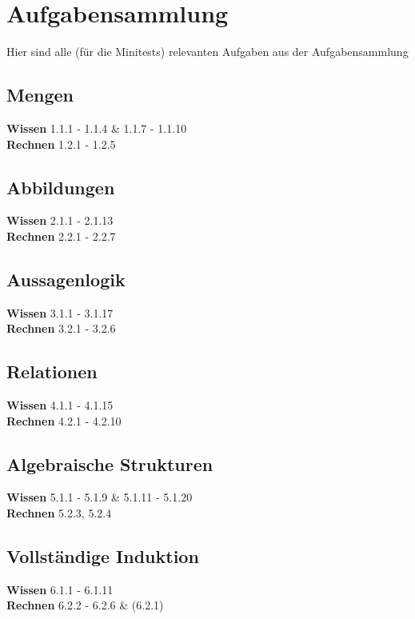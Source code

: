 \documentclass[11pt]{article}
\begin{document}
    \section{Aufgabensammlung}\label{sec:aufgabensammlung}
    Hier sind alle (für die Minitests) relevanten Aufgaben aus der Aufgabensammlung\\
    \subsection{Mengen}\label{subsec:mengen}
    \textbf{Wissen}
    1.1.1 - 1.1.4 \& 1.1.7 - 1.1.10\\
    \textbf{Rechnen}
    1.2.1 - 1.2.5

    \subsection{Abbildungen}\label{subsec:abbildungen}
    \textbf{Wissen}
    2.1.1 - 2.1.13\\
    \textbf{Rechnen}
    2.2.1 - 2.2.7
    
    \subsection{Aussagenlogik}\label{subsec:aussagenlogik}
    \textbf{Wissen}
    3.1.1 - 3.1.17\\
    \textbf{Rechnen}
    3.2.1 - 3.2.6

    \subsection{Relationen}\label{subsec:relationen}
    \textbf{Wissen}
    4.1.1 - 4.1.15\\
    \textbf{Rechnen}
    4.2.1 - 4.2.10

    \subsection{Algebraische Strukturen}\label{subsec:algebraische-strukturen}
    \textbf{Wissen}
    5.1.1 - 5.1.9 \& 5.1.11 - 5.1.20\\
    \textbf{Rechnen}
    5.2.3, 5.2.4

    \subsection{Vollständige Induktion}\label{subsec:vollstandige-induktion}
    \textbf{Wissen}
    6.1.1 - 6.1.11\\
    \textbf{Rechnen}
    6.2.2 - 6.2.6 \& (6.2.1)
\end{document}
